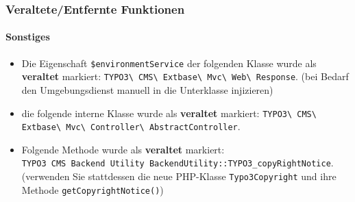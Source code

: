 \begin{frame}[fragile]
	\frametitle{Veraltete/Entfernte Funktionen}
	\framesubtitle{Sonstiges}

	\lstset{basicstyle=\tiny\ttfamily}

	\begin{itemize}

		\item Die Eigenschaft \texttt{\$environmentService} der folgenden Klasse wurde als \textbf{veraltet} markiert:
			\texttt{TYPO3\textbackslash
				CMS\textbackslash
				Extbase\textbackslash
				Mvc\textbackslash
				Web\textbackslash
				Response}.\newline
			\smaller
				(bei Bedarf den Umgebungsdienst manuell in die Unterklasse injizieren)
			\normalsize

		\item die folgende interne Klasse wurde als \textbf{veraltet} markiert:\newline
			\texttt{TYPO3\textbackslash
				CMS\textbackslash
				Extbase\textbackslash
				Mvc\textbackslash
				Controller\textbackslash
				AbstractController}.

		\item Folgende Methode wurde als \textbf{veraltet} markiert:\newline
			\texttt{TYPO3\
				CMS\
				Backend\
				Utility\
				BackendUtility::TYPO3\_copyRightNotice}.\newline
				\smaller
					(verwenden Sie stattdessen die neue PHP-Klasse \texttt{Typo3Copyright} und ihre Methode \texttt{getCopyrightNotice()})
				\normalsize

	\end{itemize}

\end{frame}


